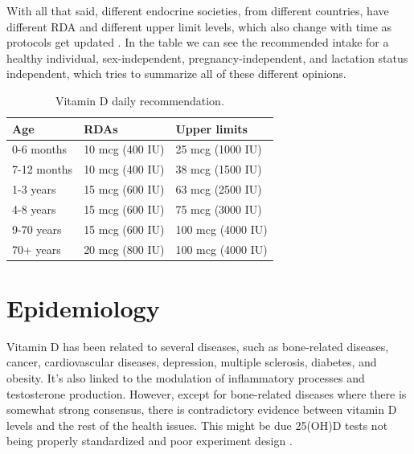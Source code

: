 With all that said, different endocrine societies, from different countries, have different RDA and different upper limit levels, which also change with time as protocols get updated \cite{ref:Bouillon2017}. In the table \cite{table:vitaminDRDAs} we can see the recommended intake for a healthy individual, sex-independent, pregnancy-independent, and lactation status independent, which tries to summarize all of these different opinions.\vspace{3 mm}

\begin{table}[H]

    \caption{Vitamin D daily recommendation.}	
	\centering
	\begin{tabular}{|l|ll|}
		\hline
		\rowcolor[HTML]{FFAAAA} 
		Age                                 & RDAs           & Upper limits              \\ \hline
		\rowcolor[HTML]{FFFFFF} 
		\cellcolor[HTML]{FFFFC7}0-6 months  & 10 mcg (400 IU) & 25 mcg (1000 IU)  \\
		\rowcolor[HTML]{FFFFFF} 
		\cellcolor[HTML]{FFFFC7}7-12 months & 10 mcg (400 IU) & 38 mcg (1500 IU)  \\
		\rowcolor[HTML]{EFEFEF} 
		\cellcolor[HTML]{EDEDBD}1-3 years   & 15 mcg (600 IU) & 63 mcg (2500 IU)  \\
		\rowcolor[HTML]{EFEFEF} 
		\cellcolor[HTML]{EDEDBD}4-8 years   & 15 mcg (600 IU) & 75 mcg (3000 IU)  \\
		\rowcolor[HTML]{FFFFFF} 
		\cellcolor[HTML]{FFFFC7}9-70 years  & 15 mcg (600 IU) & 100 mcg (4000 IU) \\
		\rowcolor[HTML]{FFFFFF} 
		\cellcolor[HTML]{FFFFC7}70+ years   & 20 mcg (800 IU) & 100 mcg (4000 IU) \\ \hline
	\end{tabular}
    \label{table:vitaminDRDAs}
 
\end{table}



\label{lb:epidemiology}
\section{Epidemiology}


Vitamin D has been related to several diseases, such as bone-related diseases, cancer, cardiovascular diseases, depression, multiple sclerosis, diabetes, and obesity. It's also linked to the modulation of inflammatory processes and testosterone production. However, except for bone-related diseases where there is somewhat strong consensus, there is contradictory evidence between vitamin D levels and the rest of the health issues. This might be due 25(OH)D tests not being properly standardized and poor experiment design \cite{ref:A_Cashman2016, ref:Sempos2018, ref:Sempos20182}.


